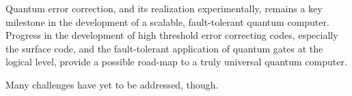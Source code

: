Quantum error correction, and its realization experimentally, remains a key
milestone in the development of a scalable, fault-tolerant quantum computer.
Progress in the development of high threshold error correcting codes, especially
the surface code, and the fault-tolerant application of quantum gates at the
logical level, provide a possible road-map to a truly universal quantum
computer.

Many challenges have yet to be addressed, though.


